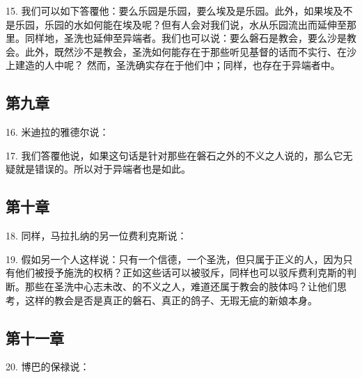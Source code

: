 15. 我们可以如下答覆他：要么乐园是乐园，要么埃及是乐园。此外，如果埃及不是乐园，乐园的水如何能在埃及呢？但有人会对我们说，水从乐园流出而延伸至那里。同样地，圣洗也延伸至异端者。我们也可以说：要么磐石是教会，要么沙是教会。此外，既然沙不是教会，圣洗如何能存在于那些听见基督的话而不实行、在沙上建造的人中呢？ 然而，圣洗确实存在于他们中；同样，也存在于异端者中。\par


\subsection{第九章}

16. 米迪拉的雅德尔说：\par

17. 我们答覆他说，如果这句话是针对那些在磐石之外的不义之人说的，那么它无疑就是错误的。所以对于异端者也是如此。\par


\subsection{第十章}

18. 同样，马拉扎纳的另一位费利克斯说：\par

19. 假如另一个人这样说：只有一个信德，一个圣洗，但只属于正义的人，因为只有他们被授予施洗的权柄？正如这些话可以被驳斥，同样也可以驳斥费利克斯的判断。那些在圣洗中心志未改、的不义之人，难道还属于教会的肢体吗？让他们思考，这样的教会是否是真正的磐石、真正的鸽子、无瑕无疵的新娘本身。\par


\subsection{第十一章}

20. 博巴的保禄说：\par

